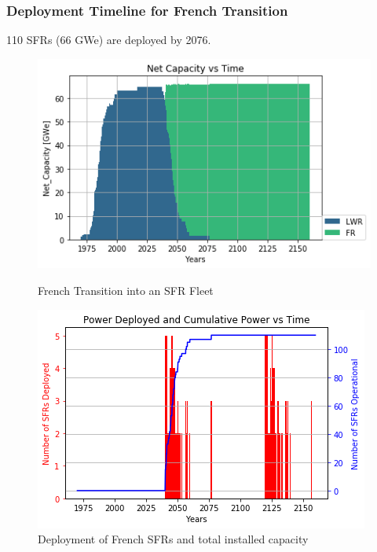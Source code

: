 \begin{frame}
	\frametitle{Deployment Timeline for French Transition}
	110 \glspl{SFR} (66 GWe) are deployed by 2076.
	\begin{figure}[htbp!]
	\begin{minipage}[b]{.45\linewidth}
        \begin{center}
                \includegraphics[width=\textwidth]{./images/french-transition/power_plot.png}
        \end{center}
        \caption{French Transition into an SFR Fleet}
        \label{fig:sfr_num}
	\end{minipage}
	\hspace{.5cm}
	\begin{minipage}[b]{.45\linewidth}
		\centering
		\includegraphics[width=\textwidth]{./images/french-transition/sfr_deploy.png}
		\caption{Deployment of French \glspl{SFR} and total installed capacity}
		\label{fig:dep}
	\end{minipage}
\end{figure}
\end{frame}
